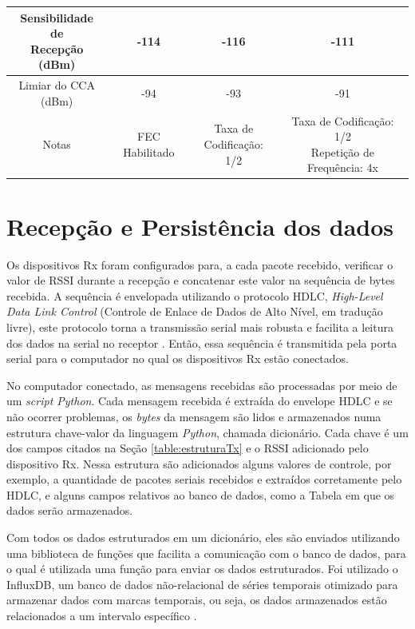 \begin{table}[h!]
\begin{tabular}{|c c c c|}
    \makecell{Sensibilidade de                                \\Recepção (dBm)       } & -114    & -116                     & -111     \\\hline
    \makecell{Limiar do CCA                                   \\(dBm)                   } & -94     & -93                      & -91      \\ \hline
    Notas     & FEC Habilitado & \makecell{Taxa de            \\Codificação: 1/2} & \makecell{Taxa de Codificação: 1/2\\Repetição de Frequência: 4x} \\ \hline
    \hline
  \end{tabular}
  \label{table:config}
\end{table}

\section{Recepção e Persistência dos dados}
Os dispositivos Rx foram configurados para, a cada pacote recebido, verificar o valor de RSSI durante a recepção e concatenar este valor na sequência de bytes recebida. A sequência é envelopada utilizando o protocolo HDLC, \emph{High-Level Data Link Control} (Controle de Enlace de Dados de Alto Nível, em tradução livre), este protocolo torna a transmissão serial mais robusta e facilita a leitura dos dados na serial no receptor \cite{tanembaum2011}. Então, essa sequência é transmitida pela porta serial para o computador no qual os dispositivos Rx estão conectados.

No computador conectado, as mensagens recebidas são processadas por  meio de um \emph{script Python}. Cada mensagem recebida é extraída do envelope HDLC e se não ocorrer problemas, os \emph{bytes} da mensagem são lidos e armazenados numa estrutura chave-valor da linguagem \emph{Python}, chamada dicionário. Cada chave é um dos campos citados na Seção \ref{table:estruturaTx} e o RSSI adicionado pelo dispositivo Rx. Nessa estrutura são adicionados alguns valores de controle, por exemplo, a quantidade de pacotes seriais recebidos e extraídos corretamente pelo HDLC, e alguns campos relativos ao banco de dados, como a Tabela em que os dados serão armazenados.

Com todos os dados estruturados em um dicionário, eles são enviados utilizando uma biblioteca de funções que facilita a comunicação com o banco de dados, para o qual é utilizada uma função para enviar os dados estruturados. Foi utilizado o InfluxDB, um banco de dados não-relacional de séries temporais otimizado para armazenar dados com marcas temporais, ou seja, os dados armazenados estão relacionados a um intervalo específico \cite{influxData}.

